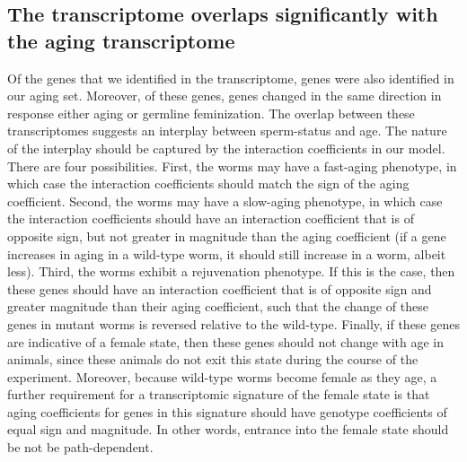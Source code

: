\subsection*{The \fog{} transcriptome overlaps significantly with the aging
transcriptome}
Of the \fogn{} genes that we identified in the \fog{}
transcriptome, \intersectn{} genes were also identified in our aging set.
Moreover, of these \intersectn{}  genes, \coexpressed{} genes changed in the
same direction in response either aging or germline feminization.
The overlap between these transcriptomes suggests an interplay between sperm-status
and age. The nature of the interplay should be captured by the interaction coefficients
in our model.
There are four possibilities. First, the \fog{} worms may
have a fast-aging phenotype, in which case the interaction coefficients should
match the sign of the aging coefficient.
Second, the \fog{} worms may
have a slow-aging phenotype, in which case the interaction coefficients should
have an interaction coefficient that is of opposite sign, but not greater in
magnitude than the aging coefficient (if a gene increases in aging in a
wild-type worm, it should still increase in a \fog{} worm, albeit less).
Third, the \fog{} worms exhibit a rejuvenation phenotype. If this is the case,
then these genes should have an interaction coefficient that is of opposite sign
and greater magnitude than their aging coefficient, such that the change of
these genes in \fog{} mutant worms is reversed relative to the wild-type.
Finally, if these genes are indicative of a female state, then these genes
should not change with age in \fog{} animals, since these animals do not exit
this state during the course of the experiment.
Moreover, because wild-type
worms become female as they age, a further requirement for a transcriptomic
signature of the female state is that aging coefficients for genes in this
signature should have genotype coefficients of equal sign and magnitude. In
other words, entrance into the female state should be not be path-dependent.



